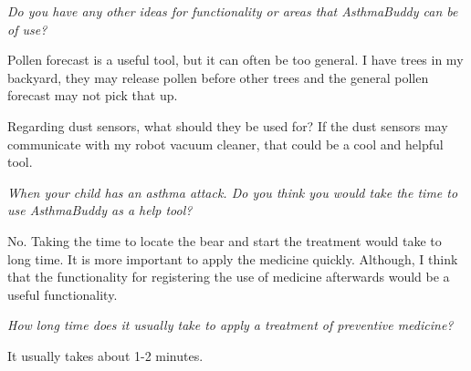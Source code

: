 \emph{Do you have any other ideas for functionality or areas that AsthmaBuddy can be of use?}

Pollen forecast is a useful tool, but it can often be too general. I have trees in my backyard, they may release pollen before other trees and the general pollen forecast may not pick that up. 

Regarding dust sensors, what should they be used for? If the dust sensors may communicate with my robot vacuum cleaner, that could be a cool and helpful tool. 


\emph{When your child has an asthma attack. Do you think you would take the time to use AsthmaBuddy as a help tool?}

No. Taking the time to locate the bear and start the treatment would take to long time. It is more important to apply the medicine quickly. Although, I think that the functionality for registering the use of medicine afterwards would be a useful functionality.

\emph{How long time does it usually take to apply a treatment of preventive medicine?}

It usually takes about 1-2 minutes. 
